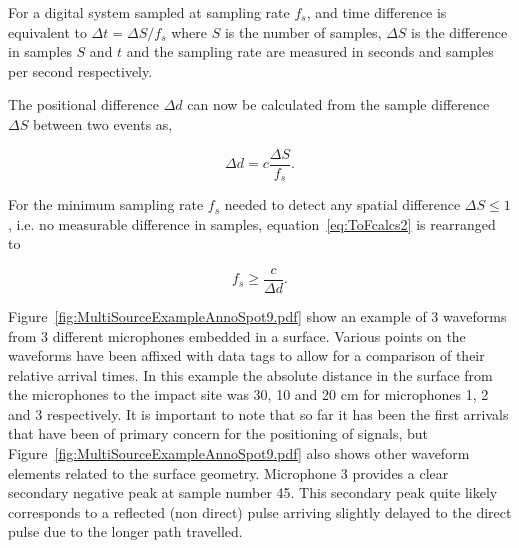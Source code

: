 For a digital system sampled at sampling rate $f_s$, and time difference is equivalent to $\Delta t = \Delta S/f_s$ where $S$ is the number of samples, $\Delta S$ is the difference in samples $S$ and $t$ and the sampling rate are measured in seconds and samples per second respectively.

The positional difference $\Delta d$ can now be calculated from the sample difference $\Delta S$ between two events as,

\begin{equation}\label{eq:ToFcalcs2}
\Delta d  = c \frac{\Delta S}{f_s}.
\end{equation}

For the minimum sampling rate $f_s$ needed to detect any spatial difference $\Delta S \leq 1$, i.e. no measurable difference in samples, equation~\ref{eq:ToFcalcs2} is rearranged to

\begin{equation}\label{eq:ToFcalcs3}
f_s  \geq \frac{c}{\Delta d}.
\end{equation}

Figure~\ref{fig:MultiSourceExampleAnnoSpot9.pdf} show an example of 3 waveforms from 3 different microphones embedded in a surface. Various points on the waveforms have been affixed with data tags to allow for a comparison of their relative arrival times. In this example the absolute distance in the surface from the microphones to the impact site was 30, 10 and 20 cm for microphones 1, 2 and 3 respectively. It is important to note that so far it has been the first arrivals that have been of primary concern for the positioning of signals, but Figure~\ref{fig:MultiSourceExampleAnnoSpot9.pdf} also shows other waveform elements related to the surface geometry. Microphone 3 provides a clear secondary negative peak at sample number 45. This secondary peak quite likely corresponds to a reflected (non direct) pulse arriving slightly delayed to the direct pulse due to the longer path travelled.

